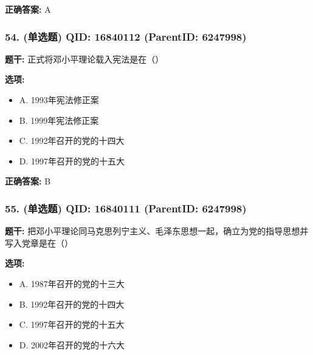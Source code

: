 \documentclass[12pt,UTF8]{ctexart}
\begin{document}
\textbf{正确答案:}
A

\vspace{0.3em}\hrulefill\vspace{0.7em}

\subsubsection*{54. (单选题) \small QID: 16840112 (ParentID: 6247998)}

\textbf{题干:}
正式将邓小平理论载入宪法是在（）



\textbf{选项:}
\begin{itemize}[leftmargin=*]

  \item A. 1993年宪法修正案

  \item B. 1999年宪法修正案

  \item C. 1992年召开的党的十四大

  \item D. 1997年召开的党的十五大

\end{itemize}

\textbf{正确答案:}
B

\vspace{0.3em}\hrulefill\vspace{0.7em}

\subsubsection*{55. (单选题) \small QID: 16840111 (ParentID: 6247998)}

\textbf{题干:}
把邓小平理论同马克思列宁主义、毛泽东思想一起，确立为党的指导思想并写入党章是在（）



\textbf{选项:}
\begin{itemize}[leftmargin=*]

  \item A. 1987年召开的党的十三大

  \item B. 1992年召开的党的十四大

  \item C. 1997年召开的党的十五大

  \item D. 2002年召开的党的十六大

\end{itemize}
\end{document}
